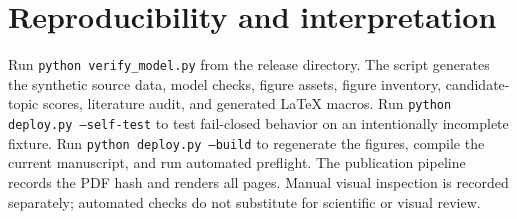 \documentclass[10pt,a4paper]{article}
\begin{document}
\section{Reproducibility and interpretation}
Run \texttt{python verify\_model.py} from the release directory. The script generates the synthetic source data, model checks, figure assets, figure inventory, candidate-topic scores, literature audit, and generated LaTeX macros. Run \texttt{python deploy.py --self-test} to test fail-closed behavior on an intentionally incomplete fixture. Run \texttt{python deploy.py --build} to regenerate the figures, compile the current manuscript, and run automated preflight. The publication pipeline records the PDF hash and renders all pages. Manual visual inspection is recorded separately; automated checks do not substitute for scientific or visual review.
\end{document}
